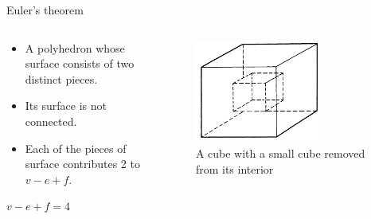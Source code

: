 \documentclass{beamer}
\begin{document}
\begin{frame}{Euler's theorem}
  \begin{columns}
    \begin{column}{0.5\textwidth}
      \begin{block}{}
        \begin{itemize}
        \item A polyhedron whose surface consists of two distinct pieces.
        \item Its surface is not connected.
        \item Each of the pieces of surface contributes 2 to $v - e + f$.
        \end{itemize}
      \end{block}
      \begin{block}{}
        $v - e + f = 4$
      \end{block}
    \end{column}
    \begin{column}{0.5\textwidth}
      \begin{figure}
        \centering
        \includegraphics[width=0.7\textwidth]{figure_1_2.png}
        \caption{A cube with a small cube removed from its interior}
      \end{figure}
    \end{column}
  \end{columns}
\end{frame}
\end{document}
